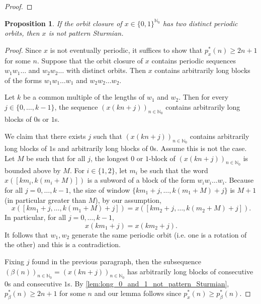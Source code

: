 \documentclass[11pt,reqno]{amsart}
\newtheorem{proposition}[theorem]{Proposition}
\theoremstyle{definition}
\theoremstyle{plain}
\newcommand{\N}{\mathbb{N}}
\begin{document}
\begin{proof}

\end{proof}

\begin{proposition}\label{prop:no-two-orbit}
If the orbit closure of $x \in \{0, 1\}^{\N_0}$ has two distinct periodic orbits, then $x$ is not pattern Sturmian. 
\end{proposition}
\begin{proof} 
Since $x$ is not eventually periodic, it suffices to show that $p_{x}^*(n) \geq 2n + 1$ for some $n$.
Suppose that the orbit closure of $x$ contains periodic sequences $w_1 w_1 \ldots$ and $w_2 w_2 \ldots$ with distinct orbits. Then %
$x$ contains arbitrarily long blocks of the forms $w_1 w_1 \ldots w_1$ and $w_2 w_2 \ldots w_2$.

Let $k$ be a common multiple of the lengths of $w_1$ and $w_2$. Then for every $j \in \{0, \ldots, k - 1\}$, the sequence $(x(kn + j))_{n \in \N_0}$ contains arbitrarily long blocks of $0$s or $1$s. 

We claim that there exists $j$ such that $(x(kn + j))_{n \in \N_0}$ contains arbitrarily long blocks of $1$s and arbitrarily long blocks of $0$s. Assume this is not the case. Let $M$ be such that for all $j$, the longest $0$ or $1$-block of $(x(kn + j))_{n \in \N_0}$ is bounded above by $M$. For $i \in \{1, 2\}$, let $m_i$ be such that the word $x([k m_i, k (m_i + M)])$ is a subword of a block of the form $w_i w_i \ldots w_i$. Because for all $j = 0, \ldots, k - 1$, the size of window $\{km_1 + j, \ldots, k(m_1 + M) + j\}$ is $M + 1$ (in particular greater than $M$), by our assumption, 
\[
    x([k m_1 + j, \ldots, k (m_1 + M) + j]) = x([k m_2 + j, \ldots, k (m_2 + M) + j]).
\]
In particular, for all $j = 0, \ldots, k - 1$,
\[
    x(k m_1 + j) = x(k m_2 + j).
\]
It follows that $w_1, w_2$ generate the same periodic orbit (i.e. one is a rotation of the other) and this is a contradiction.

Fixing $j$ found in the previous paragraph, then the subsequence $(\beta(n))_{n \in \N_0} = (x(kn + j))_{n \in \N_0}$ has arbitrarily long blocks of consecutive $0$s and consecutive $1$s. By \cref{lem:long_0_and_1_not_pattern_Sturmian}, $p_{\beta}^*(n) \geq 2n + 1$ for some $n$ and our lemma follows since $p_{x}^*(n) \geq p_{\beta}^*(n)$.
\end{proof}
\end{document}
